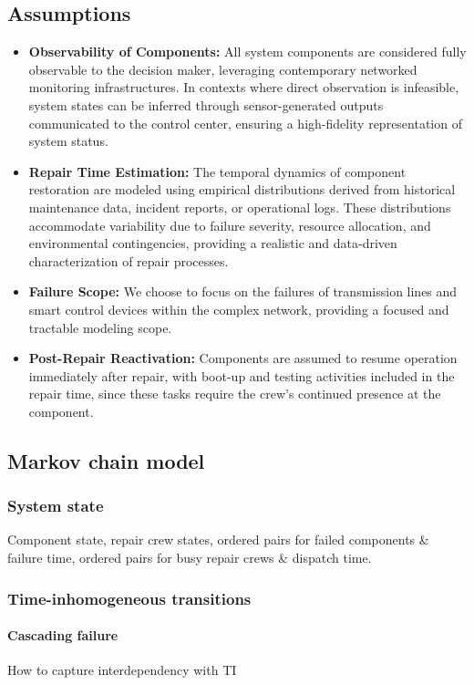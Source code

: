 \documentclass[runningheads]{llncs}
\begin{document}
\subsection{Assumptions}
\begin{itemize}
    \item \textbf{Observability of Components:} All system components are considered fully observable to the decision maker, leveraging contemporary networked monitoring infrastructures. In contexts where direct observation is infeasible, system states can be inferred through sensor-generated outputs communicated to the control center, ensuring a high-fidelity representation of system status.
    \item \textbf{Repair Time Estimation:} The temporal dynamics of component restoration are modeled using empirical distributions derived from historical maintenance data, incident reports, or operational logs. These distributions accommodate variability due to failure severity, resource allocation, and environmental contingencies, providing a realistic and data-driven characterization of repair processes.
    \item \textbf{Failure Scope: } We choose to focus on the failures of transmission lines and smart control devices within the complex network, providing a focused and tractable modeling scope.
    \item \textbf{Post-Repair Reactivation: }Components are assumed to resume operation immediately after repair, with boot-up and testing activities included in the repair time, since these tasks require the  crew’s continued presence at the component.

\end{itemize}
\subsection{Markov chain model}
\subsubsection{System state}
Component state, repair crew states, ordered pairs for failed components \& failure time, ordered pairs for busy repair crews \& dispatch time.

\subsubsection{Time-inhomogeneous transitions}
\paragraph{Cascading failure}
    How to capture interdependency with TI
\end{document}
